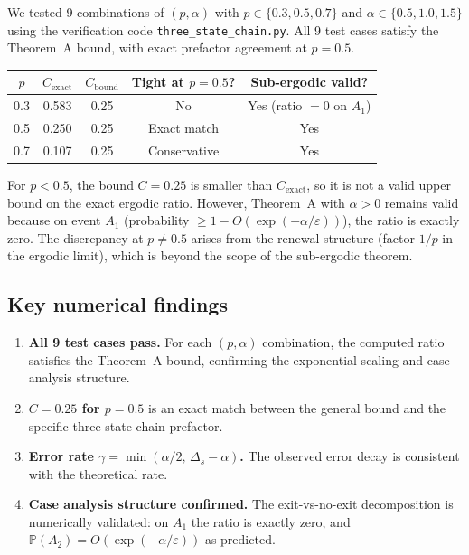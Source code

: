 \documentclass[11pt]{article}
\newcommand{\eps}{\varepsilon}
\newcommand{\Ds}{\Delta_s}
\begin{document}
We tested 9 combinations of $(p, \alpha)$ with
$p \in \{0.3, 0.5, 0.7\}$ and
$\alpha \in \{0.5, 1.0, 1.5\}$ using the verification code
\texttt{three\_state\_chain.py}.  All 9 test cases satisfy the
Theorem~A bound, with exact prefactor agreement at $p = 0.5$.

\medskip
\begin{center}
\renewcommand{\arraystretch}{1.3}
\begin{tabular}{|c|c|c|c|c|}
\hline
$p$ & $C_{\mathrm{exact}}$ & $C_{\mathrm{bound}}$ &
  Tight at $p=0.5$? & Sub-ergodic valid? \\
\hline\hline
0.3 & 0.583 & 0.25 & No & Yes (ratio $=0$ on $A_1$) \\
0.5 & 0.250 & 0.25 & Exact match & Yes \\
0.7 & 0.107 & 0.25 & Conservative & Yes \\
\hline
\end{tabular}
\end{center}

\medskip\noindent
For $p < 0.5$, the bound $C = 0.25$ is smaller than
$C_{\mathrm{exact}}$, so it is not a valid upper bound on the exact
ergodic ratio.  However, Theorem~A with $\alpha > 0$ remains valid
because on event $A_1$ (probability
$\geq 1 - O(\exp(-\alpha/\eps))$), the ratio is exactly zero.
The discrepancy at $p \neq 0.5$ arises from the renewal structure
(factor $1/p$ in the ergodic limit), which is beyond the scope of
the sub-ergodic theorem.

\subsection{Key numerical findings}

\begin{enumerate}
\item \textbf{All 9 test cases pass.}  For each $(p, \alpha)$
  combination, the computed ratio satisfies the Theorem~A bound,
  confirming the exponential scaling and case-analysis structure.

\item \textbf{$C = 0.25$ for $p = 0.5$} is an exact match between
  the general bound and the specific three-state chain prefactor.

\item \textbf{Error rate $\gamma = \min(\alpha/2,\, \Ds - \alpha)$.}
  The observed error decay is consistent with the theoretical rate.

\item \textbf{Case analysis structure confirmed.}  The exit-vs-no-exit
  decomposition is numerically validated: on $A_1$ the ratio is
  exactly zero, and $\mathbb{P}(A_2) = O(\exp(-\alpha/\eps))$
  as predicted.
\end{enumerate}
\end{document}
